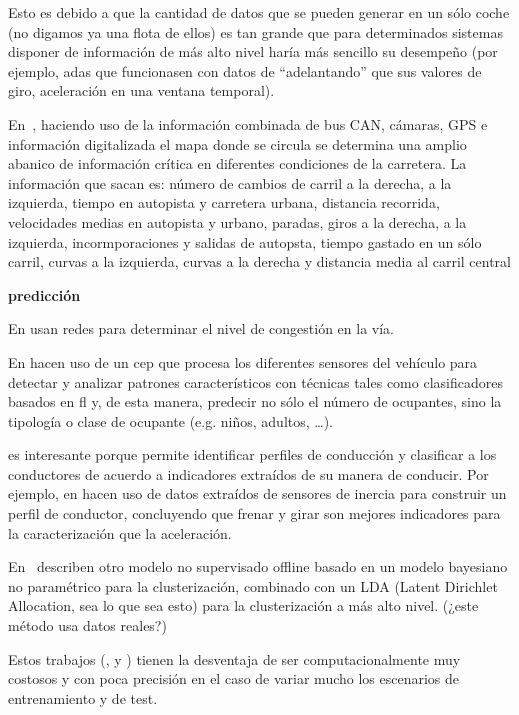 Esto es debido a que la cantidad de datos que se pueden generar en un sólo coche (no digamos ya una flota de ellos) es tan grande que para determinados sistemas disponer de información de más alto nivel haría más sencillo su desempeño (por ejemplo, \gls{adas} que funcionasen con datos de \enquote{adelantando} que sus valores de giro, aceleración en una ventana temporal).

En~\cite{satzoda2013towards}, haciendo uso de la información combinada de bus CAN, cámaras, GPS e información digitalizada el mapa donde se circula se determina una amplio abanico de información crítica en diferentes condiciones de la carretera. La información que sacan es: número de cambios de carril a la derecha, a la izquierda, tiempo en autopista y carretera urbana, distancia recorrida, velocidades medias en autopista y urbano, paradas, giros a la derecha, a la izquierda, incormporaciones y salidas de autopsta, tiempo gastado en un sólo carril, curvas a la izquierda, curvas a la derecha y distancia media al carril central

\textbf{predicción}

En \cite{Dougherty1993} usan redes para determinar el nivel de congestión en la vía.

En \cite{terroso2015complex} hacen uso de un \gls{cep} que procesa los diferentes sensores del vehículo para detectar y analizar patrones característicos con técnicas tales como clasificadores basados en \gls{fl} y, de esta manera, predecir no sólo el número de ocupantes, sino la tipología o clase de ocupante (e.g. niños, adultos, \ldots).

 es interesante porque permite identificar perfiles de conducción y clasificar a los conductores de acuerdo a indicadores extraídos de su manera de conducir. Por ejemplo, en \cite{van2013driver} hacen uso de datos extraídos de sensores de inercia para construir un perfil de conductor, concluyendo que frenar y girar son mejores indicadores para la caracterización que la aceleración.

En~\cite{bando2013unsupervised} describen otro modelo no supervisado offline basado en un modelo bayesiano no paramétrico para la clusterización, combinado con un LDA (Latent Dirichlet Allocation, sea lo que sea esto) para la clusterización a más alto nivel. (\TODO ¿este método usa datos reales?)

Estos trabajos (\cite{sekizawa2007modeling}, \cite{terada2010multi} y \cite{bando2013unsupervised}) tienen la desventaja de ser computacionalmente muy costosos y con poca precisión en el caso de variar mucho los escenarios de entrenamiento y de test.

